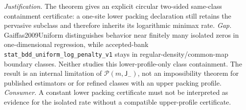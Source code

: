 \documentclass{article}
\begin{document}
\par\smallskip\noindent \textit{Justification.} The theorem gives an explicit circular two-sided same-class containment certificate: a one-site lower packing declaration still retains the pervasive subclass and therefore inherits its logarithmic minimax rate. \textit{Gap.} Gaiffas2009Uniform distinguishes behavior near finitely many isolated zeros in one-dimensional regression, while accepted-bank \texttt{stat\_bdd\_uniform\_log\_penalty\_v1} stays in regular-density/common-map boundary classes. Neither studies this lower-profile-only class containment. The result is an internal limitation of \(\mathcal P(m,\mathsf J_{-})\), not an impossibility theorem for published estimators or for refined classes with an upper packing profile. \textit{Consumer.} A constant lower packing certificate must not be interpreted as evidence for the isolated rate without a compatible upper-profile certificate.
\end{document}
